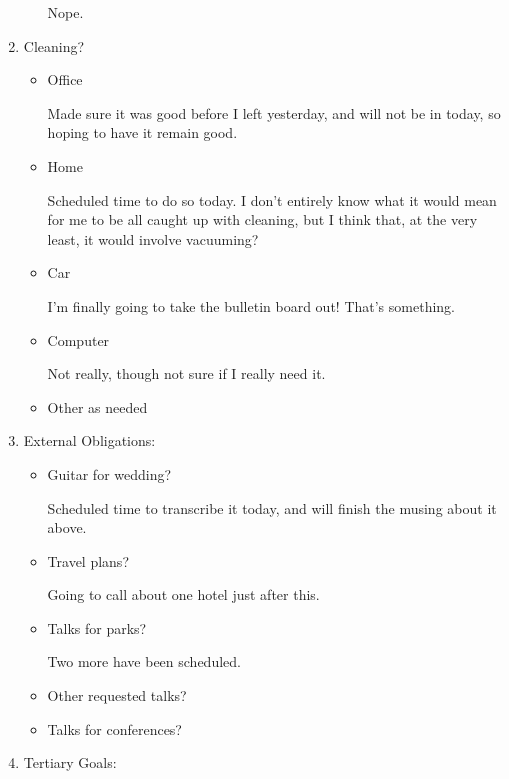 \documentclass[12pt]{article}
\renewcommand{\,}{\textsuperscript{,}}
\begin{document}
\begin{enumerate}
\begin{itemize}
Nope.

\end{itemize}

\item Cleaning?

\begin{itemize}

\item Office

Made sure it was good before I left yesterday, and will not be in today, so hoping to have it remain good.

\item Home

Scheduled time to do so today. I don't entirely know what it would mean for me to be all caught up with cleaning, but I think that, at the very least, it would involve vacuuming?

\item Car

I'm finally going to take the bulletin board out! That's something.

\item Computer

Not really, though not sure if I really need it.

\item Other as needed

\end{itemize}

\item External Obligations:

\begin{itemize}

\item Guitar for wedding?

Scheduled time to transcribe it today, and will finish the musing about it above.

\item Travel plans?

Going to call about one hotel just after this.

\item Talks for parks?

Two more have been scheduled.

\item Other requested talks?

\item Talks for conferences?

\end{itemize}

\item Tertiary Goals:


\end{enumerate}
\end{document}
